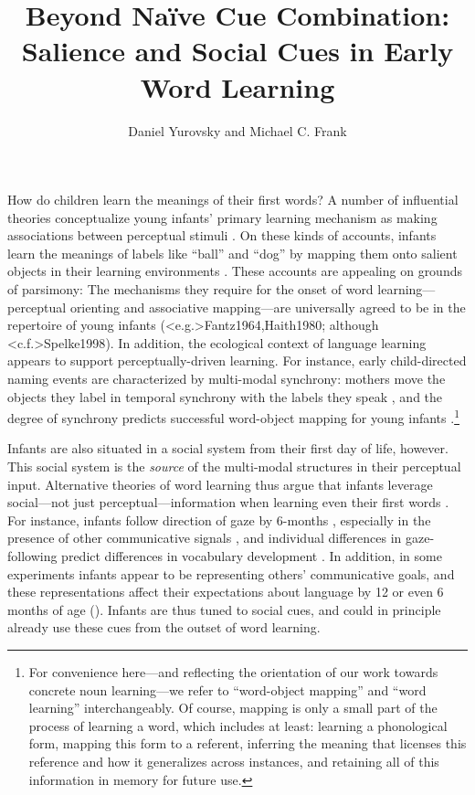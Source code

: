 \documentclass[man,floatsintext]{apa6}
\title{Beyond Na\"{i}ve Cue Combination: Salience and Social Cues in Early Word Learning}
\author{Daniel Yurovsky and Michael C. Frank}
\affiliation{Department of Psychology, Stanford University}
\begin{document}
\maketitle


How do children learn the meanings of their first words? A number of influential theories conceptualize young infants' primary learning mechanism as making associations between perceptual stimuli \cite{Piaget1952, Vygotsky1978}. On these kinds of accounts, infants learn the meanings of labels like ``ball'' and ``dog'' by mapping them onto salient objects in their learning environments \cite{Werker1998,Smith2000}. These accounts are appealing on grounds of parsimony: The mechanisms they require for the onset of word learning---perceptual orienting and associative mapping---are universally agreed to be in the repertoire of young infants (\citeNP<e.g.>{Fantz1964,Haith1980}; although \citeNP<c.f.>{Spelke1998}). In addition, the ecological context of language learning appears to support perceptually-driven learning. For instance, early child-directed naming events are characterized by multi-modal synchrony: mothers move the objects they label in temporal synchrony with the labels they speak \cite{Gogate2000}, and the degree of synchrony predicts successful word-object mapping for young infants \cite{Gogate2006}.\footnote{For convenience here---and reflecting the orientation of our work towards concrete noun learning---we refer to ``word-object mapping'' and ``word learning'' interchangeably. Of course, mapping is only a small part of the process of learning a word, which includes at least: learning a phonological form, mapping this form to a referent, inferring the meaning that licenses this reference and how it generalizes across instances, and retaining all of this information in memory for future use.}

Infants are also situated in a social system from their first day of life, however. This social system is the \emph{source} of the multi-modal structures in their perceptual input. Alternative theories of word learning thus argue that infants leverage social---not just perceptual---information when learning even their first words \cite{Bruner1983,Bloom1998}. For instance, infants follow direction of gaze by 6-months \cite{Dentremont1997}, especially in the presence of other communicative signals \cite{Senju2008}, and individual differences in gaze-following predict differences in vocabulary development \cite{Brooks2008}. In addition, in some experiments infants appear to be representing others' communicative goals, and these representations affect their expectations about language by 12 or even 6 months of age (). Infants are thus tuned to social cues, and could in principle already use these cues from the outset of word learning.
\end{document}
